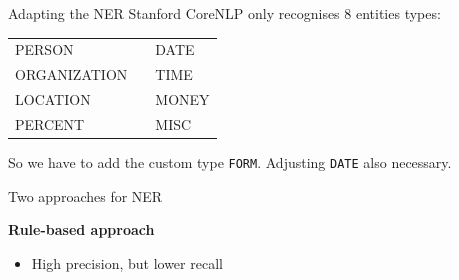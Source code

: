\documentclass[xcolor=x11names, aspectratio=169,usenames,dvipsnames]{beamer}
\begin{document}
\begin{frame}[fragile]{Adapting the NER}
Stanford CoreNLP only recognises 8 entities types:

\begin{center}\ttfamily
\begin{tabular}{lp{3em}l}
PERSON&&DATE\\
ORGANIZATION&&TIME\\
LOCATION&&MONEY\\
PERCENT&&MISC
\end{tabular}
\end{center}

So we have to add the custom type \texttt{FORM}. Adjusting \texttt{DATE} also necessary.
\end{frame}

\begin{frame}{Two approaches for NER}
\begin{minipage}[t]{0.45\textwidth}
\textbf{Rule-based approach}
\begin{itemize}
\item High precision, but lower recall


\end{itemize}
\end{minipage}
\end{frame}
\end{document}
